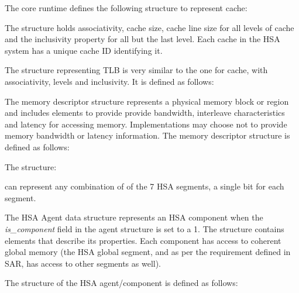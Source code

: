 The core runtime defines the following structure to represent cache:



The structure holds associativity, cache size, cache line size for
all levels of cache and the inclusivity property for all but the
last level. Each cache in the HSA system has a unique cache ID
identifying it. 

The structure representing TLB is very similar to the one for cache,
with associativity, levels and inclusivity. It is defined as follows:



The memory descriptor structure represents a physical memory block
or region and includes elements to provide provide bandwidth, interleave
characteristics and latency for accessing memory. Implementations
may choose not to provide memory bandwidth or latency information.
The memory descriptor structure is defined as follows:

 

The structure: 
 
can represent any combination of of the 7 HSA segments, a single
bit for each segment. 

The HSA Agent data structure represents an HSA component when the
{\itshape is\_component} field in the agent structure is set to a 1.
The structure contains elements that describe its properties. Each
component has access to coherent global memory (the HSA global
segment, and as per the requirement defined in SAR, has access to
other segments as well). 

The structure of the HSA agent/component is defined as follows:

%

